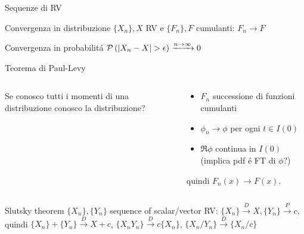\begin{frame}{Sequenze di RV}\frameintoc
\begin{block}{Convergenza in distribuzione}
$\{X_n\}, X$ RV e $\{F_n\}, F$ cumulanti: $F_n\to F$
\end{block}
\begin{block}{Convergenza in probabilit\'a}
$\prob{(|X_n-X|>\epsilon)}\xrightarrow{n\to\infty}0$
\end{block}
\begin{block}{Teorema di Paul-Levy}
\begin{columns}[T]
	\begin{column}{0.3\textwidth}
		Se conosco tutti i momenti di una distribuzione conosco la distribuzione?
	\end{column}
	\begin{column}{0.7\textwidth}
		\begin{itemize}
			\item $F_n$ successione di funzioni cumulanti
			\item $\phi_n\to\phi$ per ogni $t\in I(0)$
			\item $\Re{\phi}$ continua in $I(0)$ (implica pdf \'e FT di $\phi$?)
		\end{itemize}
		quindi $F_n(x)\to F(x)$.
	\end{column}
\end{columns}
\end{block}
\begin{block}{Slutsky theorem}
$\{X_n\},\{Y_n\}$ sequence of scalar/vector RV: $\{X_n\}\xrightarrow{D}X,\{Y_n\}\xrightarrow{P}c$, quindi $\{X_n\}+\{Y_n\}\xrightarrow{D}X+c$, $\{X_nY_n\}\xrightarrow{D}c\{X_n\}$, $\{X_n/Y_n\}\xrightarrow{D}\{X_n/c\}$
\end{block}
\end{frame}

